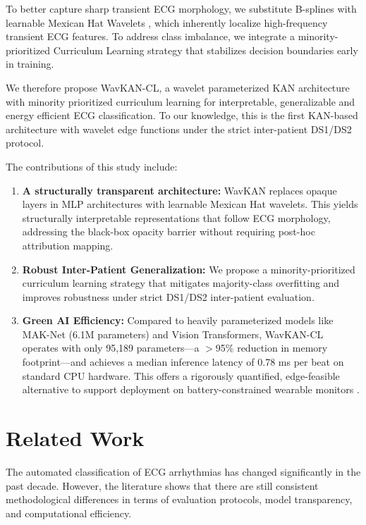 \documentclass[journal]{IEEEtran}
\begin{document}
To better capture sharp transient ECG morphology, we substitute B-splines with learnable Mexican Hat Wavelets \cite{addison_wavelet_2005, bozorgasl_liu_2024}, which inherently localize high-frequency transient ECG features. To address class imbalance, we integrate a minority-prioritized Curriculum Learning strategy \cite{bengio_curriculum_2009, schmale_curriculum_2025} that stabilizes decision boundaries early in training.

We therefore propose WavKAN-CL, a wavelet parameterized KAN architecture with minority prioritized curriculum learning for interpretable, generalizable and energy efficient ECG classification. To our knowledge, this is the first KAN-based architecture with wavelet edge functions under the strict inter-patient DS1/DS2 protocol.

The contributions of this study include:
\begin{enumerate}
    \item \textbf{A structurally transparent architecture:} WavKAN replaces opaque layers in MLP architectures with learnable Mexican Hat wavelets. This yields structurally interpretable representations that follow ECG morphology, addressing the black-box opacity barrier without requiring post-hoc attribution mapping.
    \item \textbf{Robust Inter-Patient Generalization:} We propose a minority-prioritized curriculum learning strategy that mitigates majority-class overfitting and improves robustness under strict DS1/DS2 inter-patient evaluation. 
    \item \textbf{Green AI Efficiency:} Compared to heavily parameterized models like MAK-Net (6.1M parameters) and Vision Transformers, WavKAN-CL operates with only 95,189 parameters---a $>$95\% reduction in memory footprint---and achieves a median inference latency of 0.78 ms per beat on standard CPU hardware. This offers a rigorously quantified, edge-feasible alternative to support deployment on battery-constrained wearable monitors \cite{farag_tiny_2023, elsheikhy_lightweight_2025}.
\end{enumerate}

\section{Related Work}
\label{sec:related_work}

The automated classification of ECG arrhythmias has changed significantly in the past decade. However, the literature shows that there are still consistent methodological differences in terms of evaluation protocols, model transparency, and computational efficiency.
\end{document}
